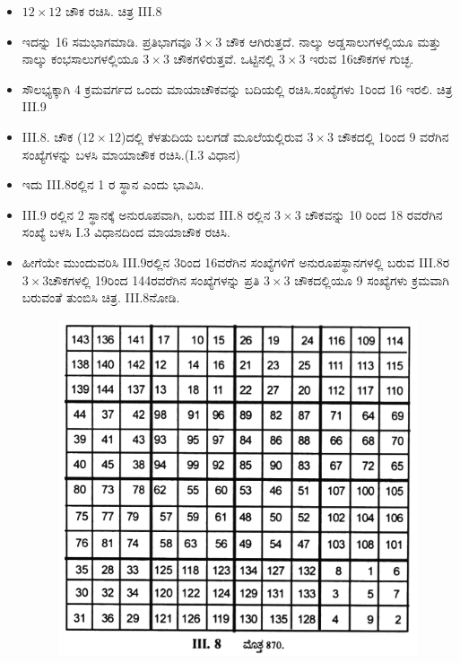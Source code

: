 \begin{itemize}
	\item $12 \times 12$ ಚೌಕ ರಚಿಸಿ. ಚಿತ್ರ  III.8
	\item ಇದನ್ನು 16 ಸಮಭಾಗಮಾಡಿ. ಪ್ರತಿಭಾಗವೂ $3 \times 3$ ಚೌಕ ಆಗಿರುತ್ತದೆ. ನಾಲ್ಕು ಅಡ್ಡಸಾಲುಗಳಲ್ಲಿಯೂ ಮತ್ತು ನಾಲ್ಕು ಕಂಭಸಾಲುಗಳಲ್ಲಿಯೂ $3 \times 3$ ಚೌಕಗಳಿರುತ್ತವೆ. ಒಟ್ಟಿನಲ್ಲಿ $3 \times 3$ ಇರುವ 16ಚೌಕಗಳ ಗುಚ್ಛ.
	\item ಸೌಲಭ್ಯಕ್ಕಾಗಿ 4 ಕ್ರಮವರ್ಗದ ಒಂದು ಮಾಯಾಚೌಕವನ್ನು ಬದಿಯಲ್ಲಿ ರಚಿಸಿ.\break ಸಂಖ್ಯೆಗಳು 1ರಿಂದ 16 ಇರಲಿ. ಚಿತ್ರ  III.9
	\item III.8. ಚೌಕ ($12 \times 12$)ದಲ್ಲಿ ಕೆಳತುದಿಯ ಬಲಗಡೆ ಮೂಲೆಯಲ್ಲಿರುವ $3 \times 3$ ಚೌಕದಲ್ಲಿ 1ರಿಂದ 9 ವರೆಗಿನ ಸಂಖ್ಯೆಗಳನ್ನು ಬಳಸಿ ಮಾಯಾಚೌಕ ರಚಿಸಿ.\break (I.3 ವಿಧಾನ)
	\item ಇದು  III.8ರಲ್ಲಿನ 1 ರ ಸ್ಥಾನ ಎಂದು ಭಾವಿಸಿ.
	\item III.9 ರಲ್ಲಿನ 2 ಸ್ಥಾನಕ್ಕೆ ಅನುರೂಪವಾಗಿ, ಬರುವ  III.8 ರಲ್ಲಿನ $3 \times 3$ ಚೌಕವನ್ನು 10 ರಿಂದ 18 ರವರೆಗಿನ ಸಂಖ್ಯೆ ಬಳಸಿ I.3 ವಿಧಾನದಿಂದ ಮಾಯಾಚೌಕ ರಚಿಸಿ.

	\item ಹೀಗೆಯೇ ಮುಂದುವರಿಸಿ  III.9ರಲ್ಲಿನ 3ರಿಂದ 16ವರೆಗಿನ ಸಂಖ್ಯೆಗಳಿಗೆ ಅನುರೂಪಸ್ಥಾನಗಳಲ್ಲಿ ಬರುವ  III.8ರ $3 \times 3$ಚೌಕಗಳಲ್ಲಿ 19ರಿಂದ 144ರವರೆಗಿನ ಸಂಖ್ಯೆಗಳನ್ನು ಪ್ರತಿ $3 \times 3$ ಚೌಕದಲ್ಲಿಯೂ 9 ಸಂಖ್ಯೆಗಳು ಕ್ರಮವಾಗಿ ಬರುವಂತೆ ತುಂಬಿಸಿ ಚಿತ್ರ. III.8ನೋಡಿ.
\newpage
	\begin{figure}[H]
	\includegraphics[scale=.8]{src/figures/chap3/fig3.35.jpg}
	\end{figure}


\end{itemize}
